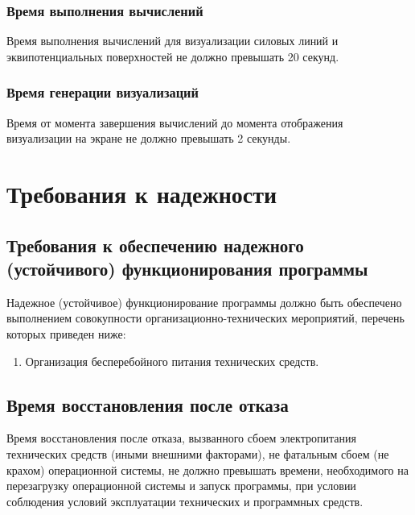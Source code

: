 \documentclass[14pt,a4paper,final]{extreport}
\begin{document}
\vspace{0.8cm}
\subsubsection{Время выполнения вычислений}
Время выполнения вычислений для визуализации силовых линий и эквипотенциальных поверхностей не должно превышать 20 секунд.
\vspace{0.8cm}

\subsubsection{Время генерации визуализаций}
Время от момента завершения вычислений до момента отображения визуализации на экране не должно превышать 2 секунды.


\pagebreak %



\section{Требования к надежности}

\subsection{Требования к обеспечению надежного (устойчивого) функционирования программы}
Надежное (устойчивое) функционирование программы должно быть обеспечено выполнением совокупности организационно-технических мероприятий, перечень которых приведен ниже:

\begin{enumerate}[label=\asbuk*),ref=\asbuk*]
	\item Организация бесперебойного питания технических средств.
\end{enumerate}

\subsection{Время восстановления после отказа}
Время восстановления после отказа, вызванного сбоем электропитания технических средств (иными внешними факторами), не фатальным сбоем (не крахом) операционной системы, не должно превышать времени, необходимого на перезагрузку операционной системы и запуск программы, при условии соблюдения условий эксплуатации технических и программных средств.
\end{document}
